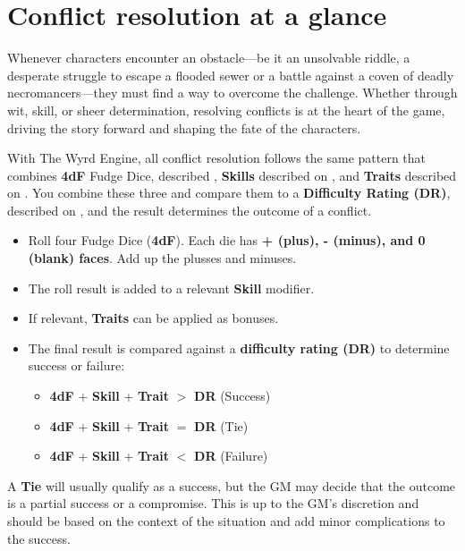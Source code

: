 \section{Conflict resolution at a glance}

Whenever characters encounter an obstacle—be it an unsolvable riddle, a desperate struggle to escape a flooded sewer or a battle against a coven of deadly necromancers—they must find a way to overcome the challenge. Whether through wit, skill, or sheer determination, resolving conflicts is at the heart of the game, driving the story forward and shaping the fate of the characters.

With The Wyrd Engine, all conflict resolution follows the same pattern that combines \textbf{4dF} Fudge Dice, described , \textbf{Skills} described on , and \textbf{Traits} described on . You combine these three and compare them to a \textbf{Difficulty Rating (DR)}, described on , and the result determines the outcome of a conflict.

\begin{WyrdExplanation}
	\begin{itemize}
		\item Roll four Fudge Dice (\textbf{4dF}).
		      Each die has \textbf{+ (plus), - (minus), and 0 (blank) faces}. Add up the plusses and minuses.
		\item The roll result is added to a relevant \textbf{Skill} modifier.
		\item If relevant, \textbf{Traits} can be applied as bonuses.
		\item The final result is compared against a \textbf{difficulty rating (DR)} to determine success or failure:
		\begin{itemize}
			\item \textbf{4dF} + \textbf{Skill} + \textbf{Trait} $>$ \textbf{DR} (Success)	
			\item \textbf{4dF} + \textbf{Skill} + \textbf{Trait} $=$ \textbf{DR} (Tie)
			\item \textbf{4dF} + \textbf{Skill} + \textbf{Trait} $<$ \textbf{DR} (Failure)
		\end{itemize}
	\end{itemize}
\end{WyrdExplanation}

A \textbf{Tie} will usually qualify as a success, but the GM may decide that the outcome is a partial success or a compromise. This is up to the GM's discretion and should be based on the context of the situation and add minor complications to the success.


